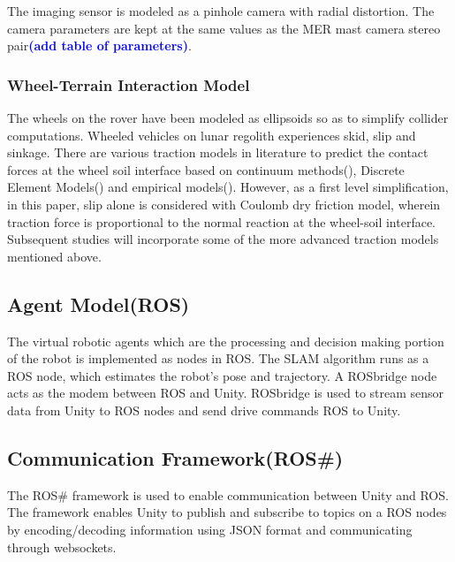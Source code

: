 \documentclass[a4paper, 10pt, conference]{ieeeconf}      %
\newcommand\coltxt[2]{\textbf{\textcolor{#1}{(#2)}}}
\newcommand\msm[1]{\coltxt{blue}{#1}}
\begin{document}
The imaging sensor is modeled as a pinhole camera with radial distortion. The camera parameters are kept at the same values as  the MER mast camera stereo pair\msm{add table of parameters}.
\subsubsection{Wheel-Terrain Interaction Model}
The wheels on the rover have been modeled as ellipsoids so as to simplify collider computations. Wheeled vehicles on lunar regolith experiences skid, slip and sinkage\cite{ding2009slip}. There are various traction models in literature to predict the contact forces at the wheel soil interface based on continuum  methods(\cite{bekker1964mechanics,wong1967behaviour,ding2015interaction}), Discrete Element Models(\cite{yoshida2003terramechanics,jeong2019development,rodriguez2019high,jiang2018experimental,jeong2019development}) and empirical models(\cite{huang2019sinkage,wong2012predicting}).  However, as a first level simplification, in this paper, slip alone is considered with Coulomb dry friction model, wherein traction force is proportional to the normal reaction at the wheel-soil interface. Subsequent studies will incorporate some of the more advanced traction models mentioned above.
\subsection{Agent Model(ROS)}
The virtual robotic agents which are the processing and decision making portion of the robot is implemented as nodes in ROS. The SLAM algorithm runs as a ROS node, which estimates the robot's pose and trajectory. A ROSbridge node\cite{crick2017rosbridge} acts as the modem between ROS and Unity. ROSbridge is used to stream sensor data from Unity  to ROS nodes  and send drive commands ROS to Unity.  
\subsection{Communication Framework(ROS\#)}
The ROS\# framework is used to enable communication between Unity and ROS. The framework enables Unity to publish and subscribe to topics on  a ROS nodes by encoding/decoding information using JSON format and communicating through websockets. 
\end{document}
